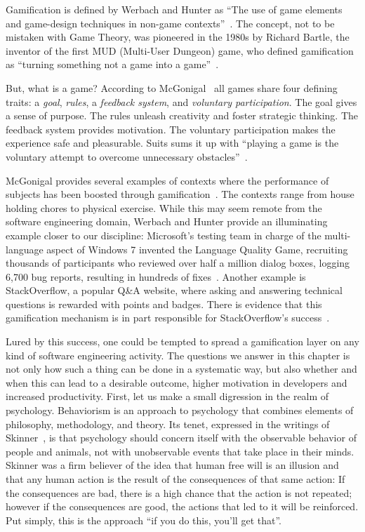 Gamification is defined by Werbach and Hunter as ``The use of game elements and game-design techniques in non-game contexts''~\cite{Werb2012a}.
The concept, not to be mistaken with Game Theory, was pioneered in the 1980s by Richard Bartle, the inventor of the first MUD (Multi-User Dungeon) game, who defined gamification as ``turning something not a game into a game''~\cite{Bart2003a}.

But, what is a game? According to McGonigal~\cite{McGo2011a} all games share four defining traits: a \emph{goal}, \emph{rules}, a \emph{feedback system}, and \emph{voluntary participation}.
The goal gives a sense of purpose.
The rules unleash creativity and foster strategic thinking.
The feedback system provides motivation.
The voluntary participation makes the experience safe and pleasurable.
Suits sums it up with ``playing a game is the voluntary attempt to overcome unnecessary obstacles''~\cite{Suit2005a}.

McGonigal provides several examples of contexts where the performance of subjects has been boosted through gamification~\cite{McGo2011a}.
The contexts range from house holding chores to physical exercise.
While this may seem remote from the software engineering domain, Werbach and Hunter provide an illuminating example closer to our discipline: Microsoft's testing team in charge of the multi-language aspect of Windows 7 invented the Language Quality Game, recruiting thousands of participants who reviewed over half a million dialog boxes, logging 6,700 bug reports, resulting in hundreds of fixes~\cite{Werb2012a}.
Another example is StackOverflow, a popular Q\&A website, where asking and answering technical questions is rewarded with points and badges.
There is evidence that this gamification mechanism is in part responsible for StackOverflow's success~\cite{Vasil2013a}.

Lured by this success, one could be tempted to spread a gamification layer on any kind of software engineering activity.
The questions we answer in this chapter is not only how such a thing can be done in a systematic way, but also whether and when this can lead to a desirable outcome, \ie higher motivation in developers and increased productivity.
First, let us make a small digression in the realm of psychology.
Behaviorism is an approach to psychology that combines elements of philosophy, methodology, and theory.
Its tenet, expressed in the writings of Skinner~\cite{Skin1978a}, is that psychology should concern itself with the observable behavior of people and animals, not with unobservable events that take place in their minds.
Skinner was a firm believer of the idea that human free will is an illusion and that any human action is the result of the consequences of that same action: If the consequences are bad, there is a high chance that the action is not repeated; however if the consequences are good, the actions that led to it will be reinforced.
Put simply, this is the approach ``if you do this, you'll get that''.

